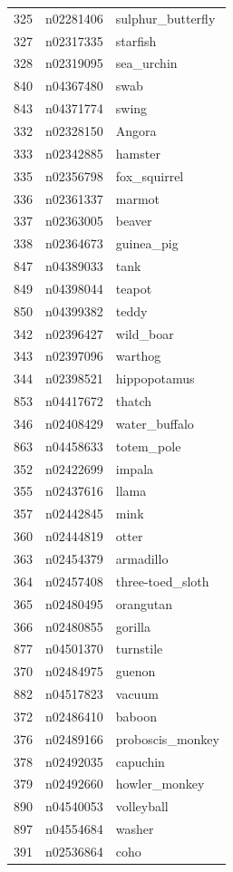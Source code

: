 \begin{table}
\begin{tabular}{cll}
325 & n02281406 & sulphur_butterfly \\
327 & n02317335 & starfish \\
328 & n02319095 & sea_urchin \\
840 & n04367480 & swab \\
843 & n04371774 & swing \\
332 & n02328150 & Angora \\
333 & n02342885 & hamster \\
335 & n02356798 & fox_squirrel \\
336 & n02361337 & marmot \\
337 & n02363005 & beaver \\
338 & n02364673 & guinea_pig \\
847 & n04389033 & tank \\
849 & n04398044 & teapot \\
850 & n04399382 & teddy \\
342 & n02396427 & wild_boar \\
343 & n02397096 & warthog \\
344 & n02398521 & hippopotamus \\
853 & n04417672 & thatch \\
346 & n02408429 & water_buffalo \\
863 & n04458633 & totem_pole \\
352 & n02422699 & impala \\
355 & n02437616 & llama \\
357 & n02442845 & mink \\
360 & n02444819 & otter \\
363 & n02454379 & armadillo \\
364 & n02457408 & three-toed_sloth \\
365 & n02480495 & orangutan \\
366 & n02480855 & gorilla \\
877 & n04501370 & turnstile \\
370 & n02484975 & guenon \\
882 & n04517823 & vacuum \\
372 & n02486410 & baboon \\
376 & n02489166 & proboscis_monkey \\
378 & n02492035 & capuchin \\
379 & n02492660 & howler_monkey \\
890 & n04540053 & volleyball \\
897 & n04554684 & washer \\
391 & n02536864 & coho \\

\end{tabular}
\end{table}

